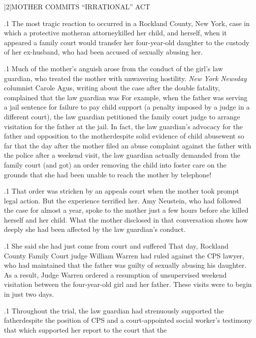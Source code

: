 \documentclass[11pt, twoside]{article}
\begin{document}
{\s|2|{MOTHER COMMITS ``IRRATIONAL'' ACT}

\p.1{%
\noindent{}The most tragic reaction to  occurred in
a Rockland County, New York, case in which a protective
mother\mdash{}an attorney\mdash{}killed her child, and herself, when it appeared a family
court would transfer her four-year-old daughter to the custody of her
ex-husband, who had been accused of sexually abusing her.
}%

\p.1{%
Much of the mother’s anguish arose from the conduct of the girl’s
law guardian, who treated the mother with unwavering hostility. \textit{New
York Newsday} columnist Carole Agus, writing about the case after the
double fatality, complained that the law guardian was  For
example, when the father was serving a jail sentence for failure to pay
child support (a penalty imposed by a judge in a different court), the law
guardian petitioned the family court judge to arrange visitation for the
father at the jail. In fact, the law guardian’s advocacy for the father and
opposition to the mother\mdash{}despite solid evidence of child abuse\mdash{}went
so far that the day after the mother filed an abuse complaint against the
father with the police after a weekend visit, the law guardian actually
demanded from the family court (and got) an order removing the child
into foster care on the grounds that she had been unable to reach the
mother by telephone!
}%

\p.1{%
That order was stricken by an appeals court when the mother took
prompt legal action. But the experience terrified her. Amy Neustein,
who had followed the case for almost a year, spoke to the mother just a
few hours before she killed herself and her child. What the mother disclosed in that conversation shows how deeply she had been affected by
the law guardian’s conduct.
}%

\p.1{%
She said she had just come from court and suffered  That day, Rockland County Family Court judge William Warren
had ruled against the CPS lawyer, who had maintained that the father
was guilty of sexually abusing his daughter. As a result, Judge Warren
ordered a resumption of unsupervised weekend visitation between the
four-year-old girl and her father. These visits were to begin in just two
days.
}%

\p.1{%
Throughout the trial, the law guardian had strenuously supported
the father\mdash{}despite the position of CPS and a court-appointed social
worker’s testimony that  which supported her report to
the court that the 
}%

}
\end{document}
